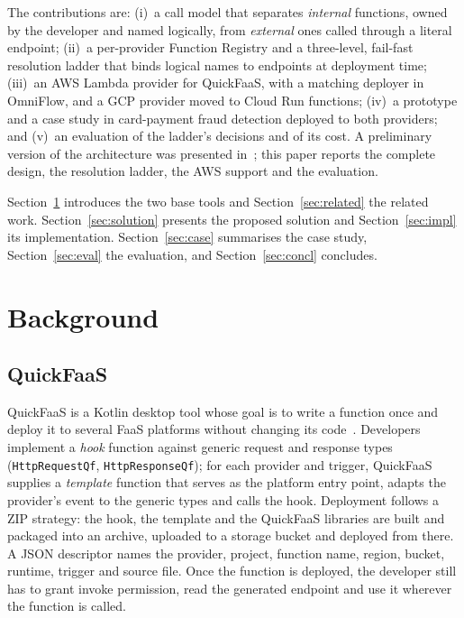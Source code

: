\documentclass[conference]{IEEEtran}
\begin{document}
The contributions are: (i)~a call model that separates \emph{internal} functions, owned by the
developer and named logically, from \emph{external} ones called through a literal endpoint;
(ii)~a per-provider Function Registry and a three-level, fail-fast resolution ladder that binds
logical names to endpoints at deployment time; (iii)~an AWS Lambda provider for QuickFaaS, with a
matching deployer in OmniFlow, and a GCP provider moved to Cloud Run functions; (iv)~a prototype
and a case study in card-payment fraud detection deployed to both providers; and (v)~an evaluation
of the ladder's decisions and of its cost. A preliminary version of the architecture was
presented in~\cite{carvalho2026towards}; this paper reports the complete design, the resolution
ladder, the AWS support and the evaluation.

Section~\ref{sec:background} introduces the two base tools and Section~\ref{sec:related} the
related work. Section~\ref{sec:solution} presents the proposed solution and
Section~\ref{sec:impl} its implementation. Section~\ref{sec:case} summarises the case study,
Section~\ref{sec:eval} the evaluation, and Section~\ref{sec:concl} concludes.

\section{Background}
\label{sec:background}

\subsection{QuickFaaS}
QuickFaaS is a Kotlin desktop tool whose goal is to write a function once and deploy it to several
FaaS platforms without changing its code~\cite{rodrigues2022quickfaas}. Developers implement a
\emph{hook} function against generic request and response types (\texttt{HttpRequestQf},
\texttt{HttpResponseQf}); for each provider and trigger, QuickFaaS supplies a \emph{template}
function that serves as the platform entry point, adapts the provider's event to the generic types
and calls the hook. Deployment follows a ZIP strategy: the hook, the template and the QuickFaaS
libraries are built and packaged into an archive, uploaded to a storage bucket and deployed from
there. A JSON descriptor names the provider, project, function name, region, bucket, runtime,
trigger and source file. Once the function is deployed, the developer still has to grant invoke
permission, read the generated endpoint and use it wherever the function is called.
\end{document}
